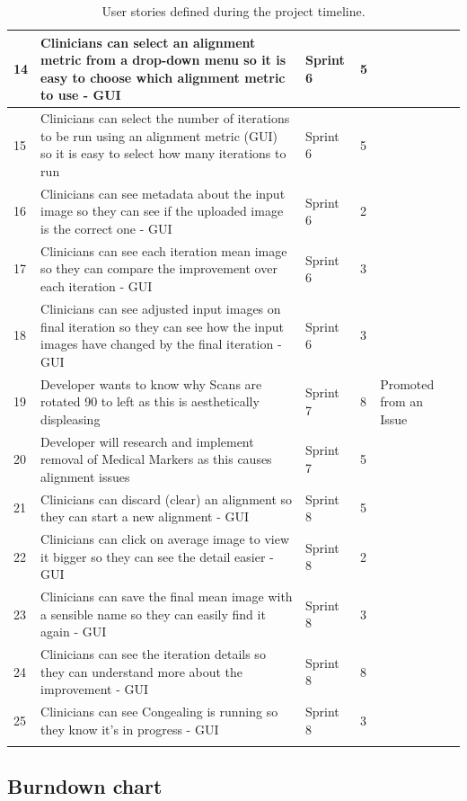 \begin{center}
\begin{longtable}{| p{2cm} | p{4cm} | p{2cm}  | p{2cm} | p{3cm} |}
      14 & Clinicians can select an alignment metric from a drop-down menu so it is easy to choose which alignment metric to use - \acrshort{GUI} & Sprint 6 & 5 & \\ \hline
      15 & Clinicians can select the number of iterations to be run using an alignment metric (GUI) so it is easy to select how many iterations to run & Sprint 6 & 5 & \\ \hline
      16 & Clinicians can see metadata about the input image so they can see if the uploaded image is the correct one - \acrshort{GUI} & Sprint 6 & 2 & \\ \hline
      17 & Clinicians can see each iteration mean image so they can compare the improvement over each iteration - \acrshort{GUI} & Sprint 6 & 3 & \\ \hline
      18 & Clinicians can see adjusted input images on final iteration so they can see how the input images have changed by the final iteration - \acrshort{GUI} & Sprint 6 & 3 & \\ \hline
      19 & Developer wants to know why Scans are rotated 90 to left as this is aesthetically displeasing & Sprint 7 & 8 & Promoted from an Issue \\ \hline
      20 & Developer will research and implement removal of Medical Markers as this causes alignment issues & Sprint 7 & 5 & \\ \hline
      21 & Clinicians can discard (clear) an alignment so they can start a new alignment - \acrshort{GUI} & Sprint 8 & 5 & \\ \hline
      22 & Clinicians can click on average image to view it bigger so they can see the detail easier - \acrshort{GUI} & Sprint 8 & 2 & \\ \hline
      23 & Clinicians can save the final mean image with a sensible name so they can easily find it again - \acrshort{GUI} & Sprint 8 & 3 & \\ \hline
      24 & Clinicians can see the iteration details so they can understand more about the improvement - \acrshort{GUI} & Sprint 8 & 8 & \\ \hline
      25 & Clinicians can see \Gls{Congealing} is running so they know it's in progress - \acrshort{GUI} & Sprint 8 & 3 & \\ \hline
  \caption{User stories defined during the project timeline.}
  \label{table:User Stories}
\end{longtable}
\end{center}
\subsection{Burndown chart}

